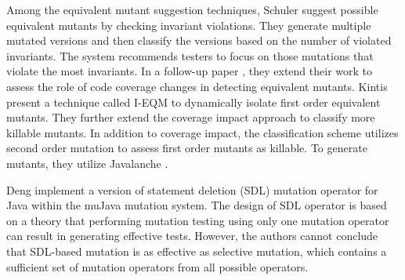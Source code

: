 Among the equivalent mutant suggestion techniques, Schuler \etal \cite{schuler:issta09} suggest possible equivalent mutants by checking invariant violations. They
generate multiple mutated versions and then classify the versions based on the number of violated invariants.
The system recommends testers to focus on those mutations that violate the most invariants.
In a follow-up paper \cite{schuler:tvr12}, they extend their work to assess the role of code coverage changes in detecting equivalent mutants. 
Kintis \etal \cite{kintis:icst12} present a technique called I-EQM to dynamically isolate first order equivalent mutants. They
further extend the coverage impact approach \cite{schuler:tvr12} to classify more killable mutants.  
In addition to coverage impact, the classification scheme utilizes second order mutation to assess first order mutants as killable. 
To generate mutants, they utilize Javalanche \cite{schuler:tvr12}.

Deng \etal \cite{deng:icst13} implement a version of statement deletion (SDL) mutation operator for Java within the muJava mutation system. The design of SDL operator is based on a theory that performing mutation testing using only one mutation operator can result in generating effective tests. However, the authors cannot conclude that SDL-based mutation is as effective as selective mutation, which contains a sufficient set of mutation operators from all possible operators. 

